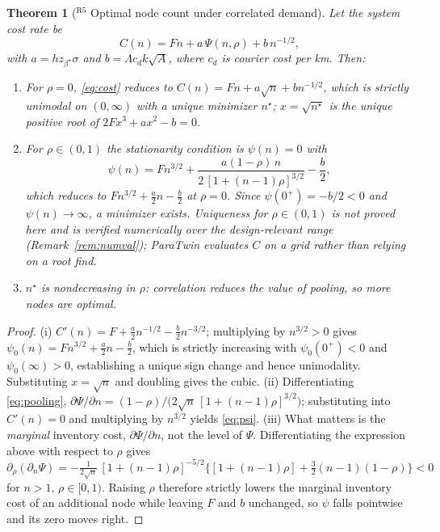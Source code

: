 \documentclass[10pt,twocolumn,letterpaper]{article}
\newtheorem{theorem}{Theorem}
\theoremstyle{definition}
\begin{document}
\begin{theorem}[$^{\mathrm{R5}}$ Optimal node count under correlated demand]\label{thm:nodecount}
Let the system cost rate be
\begin{equation}\label{eq:cost}
C(n)=Fn+a\,\Psi(n,\rho)+b\,n^{-1/2},
\end{equation}
with $a=hz_{\beta^\star}\sigma$ and $b=\Lambda c_dk\sqrt{A}$, where $c_d$ is courier cost per km. Then:
\begin{enumerate}
\item[(i)] For $\rho=0$, \eqref{eq:cost} reduces to $C(n)=Fn+a\sqrt{n}+bn^{-1/2}$, which is strictly unimodal on $(0,\infty)$ with a unique minimizer $n^\star$; $x=\sqrt{n^\star}$ is the unique positive root of $2Fx^3+ax^2-b=0$.
\item[(ii)] For $\rho\in(0,1)$ the stationarity condition is $\psi(n)=0$ with
\begin{equation}\label{eq:psi}
\psi(n)=Fn^{3/2}+\frac{a(1-\rho)\,n}{2\,[1+(n-1)\rho]^{3/2}}-\frac{b}{2},
\end{equation}
which reduces to $Fn^{3/2}+\tfrac{a}{2}n-\tfrac{b}{2}$ at $\rho=0$. Since $\psi(0^+)=-b/2<0$ and $\psi(n)\to\infty$, a minimizer exists. Uniqueness for $\rho\in(0,1)$ is \emph{not} proved here and is verified numerically over the design-relevant range (Remark~\ref{rem:numval}); ParaTwin evaluates $C$ on a grid rather than relying on a root find.
\item[(iii)] $n^\star$ is nondecreasing in $\rho$: correlation reduces the value of pooling, so more nodes are optimal.
\end{enumerate}
\end{theorem}
\begin{proof}
(i) $C'(n)=F+\tfrac{a}{2}n^{-1/2}-\tfrac{b}{2}n^{-3/2}$; multiplying by $n^{3/2}>0$ gives $\psi_0(n)=Fn^{3/2}+\tfrac a2 n-\tfrac b2$, which is strictly increasing with $\psi_0(0^+)<0$ and $\psi_0(\infty)>0$, establishing a unique sign change and hence unimodality. Substituting $x=\sqrt n$ and doubling gives the cubic. (ii) Differentiating \eqref{eq:pooling}, $\partial\Psi/\partial n=(1-\rho)\bigl/\bigl(2\sqrt n\,[1+(n-1)\rho]^{3/2}\bigr)$; substituting into $C'(n)=0$ and multiplying by $n^{3/2}$ yields \eqref{eq:psi}. (iii) What matters is the \emph{marginal} inventory cost, $\partial\Psi/\partial n$, not the level of $\Psi$. Differentiating the expression above with respect to $\rho$ gives $\partial_\rho(\partial_n\Psi)=-\tfrac{1}{2\sqrt n}\,[1+(n-1)\rho]^{-5/2}\bigl\{[1+(n-1)\rho]+\tfrac32(n-1)(1-\rho)\bigr\}<0$ for $n>1$, $\rho\in[0,1)$. Raising $\rho$ therefore strictly lowers the marginal inventory cost of an additional node while leaving $F$ and $b$ unchanged, so $\psi$ falls pointwise and its zero moves right.
\end{proof}
\end{document}

